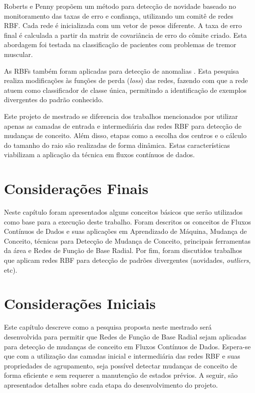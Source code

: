 \documentclass[qual, classic, a4paper]{ufbathesis}
\begin{document}
Roberts e Penny \cite{Roberts:Penny:Novelty:Confidence} propõem  um método para detecção de novidade baseado no monitoramento das taxas de erro e confiança, 
utilizando um comitê de redes RBF. 
Cada rede é inicializada com um vetor de pesos diferente.
A taxa de erro final é calculada a partir da matriz de covariância de erro do cômite criado.
Esta abordagem foi testada na classificação de pacientes com problemas de tremor muscular.

As RBFs também foram aplicadas para detecção de anomalias \cite{Bazargani2018RadialBF}.
Esta pesquisa realiza modificações às funções de perda (\textit{loss}) das redes, 
fazendo com que a rede atuem como classificador de classe única, 
permitindo a identificação de exemplos divergentes do padrão conhecido.

Este projeto de mestrado se diferencia dos trabalhos mencionados por utilizar apenas as camadas de entrada e intermediária das redes RBF para detecção de mudanças de conceito.
Além disso, etapas como a escolha dos centros e o cálculo do tamanho do raio são realizadas de forma dinâmica.
Estas características viabilizam a aplicação da técnica em fluxos contínuos de dados.

\section{Considerações Finais}

Neste capítulo foram apresentados alguns conceitos básicos que serão utilizados como base para a execução deste trabalho. 
Foram descritos os conceitos de 
Fluxos Contínuos de Dados e suas aplicações em Aprendizado de Máquina,
Mudança de Conceito,
técnicas para Detecção de Mudança de Conceito,
principais ferramentas da área e 
Redes de Função de Base Radial.
Por fim,
foram discutidos trabalhos que aplicam redes RBF para detecção de padrões divergentes (novidades, \textit{outliers}, etc).

 \label{plano_pesquisa}
\section{Considerações Iniciais}

Este capítulo descreve como a pesquisa proposta neste mestrado será desenvolvida para permitir que Redes de Função de Base Radial sejam aplicadas para detecção de mudanças de conceito em Fluxos Contínuos de Dados.
Espera-se que com a utilização das camadas inicial e intermediária das redes RBF e suas propriedades de agrupamento, seja possível detectar mudanças de conceito de forma eficiente e sem requerer a manutenção de estados prévios.
A seguir, são apresentados detalhes sobre cada etapa do desenvolvimento do projeto.
\end{document}
